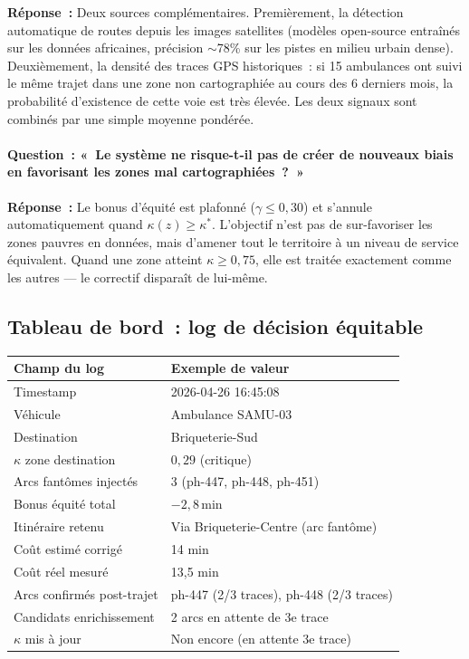 \documentclass[12pt,a4paper]{article}
\theoremstyle{definition}
\theoremstyle{remark}
\begin{document}
\noindent\textbf{Réponse~:} Deux sources complémentaires.
Premièrement, la détection automatique de routes depuis les images
satellites (modèles open-source entraînés sur les données africaines,
précision $\sim$78\% sur les pistes en milieu urbain dense).
Deuxièmement, la densité des traces GPS historiques~: si 15 ambulances
ont suivi le même trajet dans une zone non cartographiée au cours
des 6 derniers mois, la probabilité d'existence de cette voie est
très élevée. Les deux signaux sont combinés par une simple moyenne
pondérée.

\paragraph{Question~: «~Le système ne risque-t-il pas de créer
de nouveaux biais en favorisant les zones mal cartographiées~?~»}

\noindent\textbf{Réponse~:} Le bonus d'équité est plafonné ($\gamma \leq 0{,}30$)
et s'annule automatiquement quand $\kappa(z) \geq \kappa^*$.
L'objectif n'est pas de sur-favoriser les zones pauvres en données,
mais d'amener tout le territoire à un niveau de service équivalent.
Quand une zone atteint $\kappa \geq 0{,}75$, elle est traitée
exactement comme les autres --- le correctif disparaît de lui-même.

\subsection{Tableau de bord~: log de décision équitable}

\begin{center}
\begin{tabular}{ll}
  \toprule
  \textbf{Champ du log} & \textbf{Exemple de valeur} \\
  \midrule
  Timestamp                  & 2026-04-26 16:45:08 \\
  Véhicule                   & Ambulance SAMU-03 \\
  Destination                & Briqueterie-Sud \\
  $\kappa$ zone destination  & $0{,}29$ (critique) \\
  Arcs fantômes injectés     & 3 (ph-447, ph-448, ph-451) \\
  Bonus équité total         & $-2{,}8\,\text{min}$ \\
  Itinéraire retenu          & Via Briqueterie-Centre (arc fantôme) \\
  Coût estimé corrigé        & 14 min \\
  Coût réel mesuré           & 13,5 min \\
  Arcs confirmés post-trajet & ph-447 (2/3 traces), ph-448 (2/3 traces) \\
  Candidats enrichissement   & 2 arcs en attente de 3e trace \\
  $\kappa$ mis à jour        & Non encore (en attente 3e trace) \\
  \bottomrule
\end{tabular}
\end{center}
\end{document}
